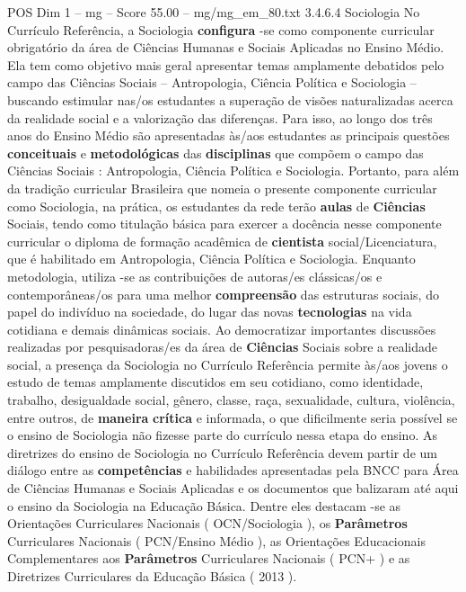 \begin{textsample}{POS Dim 1 – mg – Score 55.00 – mg/mg\_em\_80.txt}  \label{ex:f1_pos_232}
3.4.6.4 Sociologia No Currículo Referência, a Sociologia \textbf{configura} -se como componente curricular obrigatório da área de Ciências Humanas e Sociais Aplicadas no Ensino Médio.
Ela tem como objetivo mais geral apresentar temas amplamente debatidos pelo campo das Ciências Sociais – Antropologia, Ciência Política e Sociologia – buscando estimular nas/os estudantes a superação de visões naturalizadas acerca da realidade social e a valorização das diferenças.
Para isso, ao longo dos três anos do Ensino Médio são apresentadas às/aos estudantes as principais questões \textbf{conceituais} e \textbf{metodológicas} das \textbf{disciplinas} que compõem o campo das Ciências Sociais : Antropologia, Ciência Política e Sociologia.
Portanto, para além da tradição curricular Brasileira que nomeia o presente componente curricular como Sociologia, na prática, os estudantes da rede terão \textbf{aulas} de \textbf{Ciências} Sociais, tendo como titulação básica para exercer a docência nesse componente curricular o diploma de formação acadêmica de \textbf{cientista} social/Licenciatura, que é habilitado em Antropologia, Ciência Política e Sociologia.
Enquanto metodologia, utiliza -se as contribuições de autoras/es clássicas/os e contemporâneas/os para uma melhor \textbf{compreensão} das estruturas sociais, do papel do indivíduo na sociedade, do lugar das novas \textbf{tecnologias} na vida cotidiana e demais dinâmicas sociais.
Ao democratizar importantes discussões realizadas por pesquisadoras/es da área de \textbf{Ciências} Sociais sobre a realidade social, a presença da Sociologia no Currículo Referência permite às/aos jovens o estudo de temas amplamente discutidos em seu cotidiano, como identidade, trabalho, desigualdade social, gênero, classe, raça, sexualidade, cultura, violência, entre outros, de \textbf{maneira} \textbf{crítica} e informada, o que dificilmente seria possível se o ensino de Sociologia não fizesse parte do currículo nessa etapa do ensino.
As diretrizes do ensino de Sociologia no Currículo Referência devem partir de um diálogo entre as \textbf{competências} e habilidades apresentadas pela BNCC para Área de Ciências Humanas e Sociais Aplicadas e os documentos que balizaram até aqui o ensino da Sociologia na Educação Básica.
Dentre eles destacam -se as Orientações Curriculares Nacionais ( OCN/Sociologia ), os \textbf{Parâmetros} Curriculares Nacionais ( PCN/Ensino Médio ), as Orientações Educacionais Complementares aos \textbf{Parâmetros} Curriculares Nacionais ( PCN+ ) e as Diretrizes Curriculares da Educação Básica ( 2013 ).

\end{textsample}
